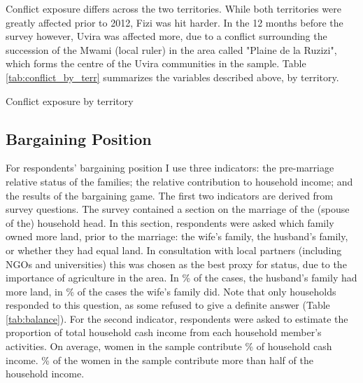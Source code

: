 \documentclass[10pt,a4paper,abstract=on]{scrartcl} %
\newcommand{\tableloc}{C:/Users/Koen/Dropbox/PhD/Papers/CongoGBV/Tables}
\begin{document}
Conflict exposure differs across the two territories. While both territories were greatly affected prior to 2012, Fizi was hit harder. In the 12 months before the survey however, Uvira was affected more, due to a conflict surrounding the succession of the Mwami (local ruler) in the area called "Plaine de la Ruzizi", which forms the centre of the Uvira communities in the sample. Table \ref{tab:conflict_by_terr} summarizes the variables described above, by territory.

\begin{table}[htb]
\centering
\caption{Conflict exposure by territory }
\label{tab:conflict_by_terr}

\end{table}


\subsection*{Bargaining Position}
For respondents' bargaining position I use three indicators: the pre-marriage relative status of the families; the relative contribution to household income; and the results of the bargaining game. The first two indicators are derived from survey questions. The survey contained a section on the marriage of the (spouse of the) household head. In this section, respondents were asked which family owned more land, prior to the marriage: the wife's family, the husband's family, or whether they had equal land. In consultation with local partners (including NGOs and universities) this was chosen as the best proxy for status, due to the importance of agriculture in the area. In \% of the cases, the husband's family had more land, in \% of the cases the wife's family did. Note that only  households responded to this question, as some refused to give a definite answer (Table \ref{tab:balance}). For the second indicator, respondents were asked to estimate the proportion of total household cash income from each household member's activities. On average, women in the sample contribute \% of household cash income. \% of the women in the sample contribute more than half of the household income.
\end{document}
